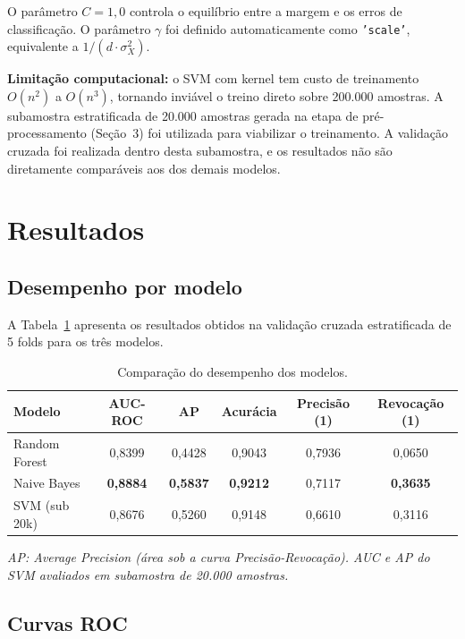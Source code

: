 \documentclass[a4paper,12pt]{article}
\begin{document}
O parâmetro $C = 1{,}0$ controla o equilíbrio entre a margem e os erros de classificação. O parâmetro $\gamma$ foi definido automaticamente como \texttt{'scale'}, equivalente a $1 / (d \cdot \sigma^2_X)$.

\textbf{Limitação computacional:} o SVM com kernel tem custo de treinamento $O(n^2)$ a $O(n^3)$, tornando inviável o treino direto sobre 200.000 amostras. A subamostra estratificada de 20.000 amostras gerada na etapa de pré-processamento (Seção~3) foi utilizada para viabilizar o treinamento. A validação cruzada foi realizada dentro desta subamostra, e os resultados não são diretamente comparáveis aos dos demais modelos.

\newpage

\section{Resultados}

\subsection{Desempenho por modelo}

A Tabela~\ref{tab:resultados} apresenta os resultados obtidos na validação cruzada estratificada de 5 folds para os três modelos.

\begin{table}[H]
\centering
\caption{Comparação do desempenho dos modelos.}
\label{tab:resultados}
\begin{tabular}{lccccc}
\toprule
\textbf{Modelo} & \textbf{AUC-ROC} & \textbf{AP} & \textbf{Acurácia} & \textbf{Precisão (1)} & \textbf{Revocação (1)} \\
\midrule
Random Forest   & 0,8399 & 0,4428 & 0,9043 & 0,7936 & 0,0650 \\
Naive Bayes     & \textbf{0,8884} & \textbf{0,5837} & \textbf{0,9212} & 0,7117 & \textbf{0,3635} \\
SVM (sub 20k)   & 0,8676 & 0,5260 & 0,9148 & 0,6610 & 0,3116 \\
\bottomrule
\end{tabular}
\end{table}

\noindent\textit{AP: Average Precision (área sob a curva Precisão-Revocação). AUC e AP do SVM avaliados em subamostra de 20.000 amostras.}

\subsection{Curvas ROC}
\end{document}

